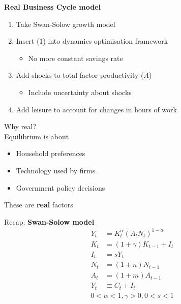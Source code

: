 \documentclass{beamer}
\begin{document}
\begin{frame}
  \textbf{Real Business Cycle model}\\
  \begin{enumerate}
    \item Take Swan-Solow growth model
    \item Insert (1) into dynamics optimisation framework
    \begin{itemize}
      \item No more constant savings rate
    \end{itemize}
    \item Add shocks to total factor productivity ($A$)
    \begin{itemize}
      \item Include uncertainty about shocks
    \end{itemize}
    \item Add leisure to account for changes in hours of work
  \end{enumerate}
\end{frame}

\begin{frame}
  Why real?\\
  \medskip
  Equilibrium is about
  \begin{itemize}
    \item Household preferences
    \item Technology used by firms
    \item Government policy decisions
  \end{itemize}
  \medskip
  These are \textbf{real} factors
\end{frame}

\begin{frame}
  Recap: \textbf{Swan-Solow model}
  \begin{align}
    Y_t &= K_t^{\alpha}(A_tN_t)^{1-\alpha}\\
    K_t &= (1+\gamma)K_{t-1} + I_t\\
    I_t &= sY_t\\
    N_t &= (1+n)N_{t-1}\\
    A_t &= (1+m)A_{t-1}\\
    Y_t &\equiv C_t + I_t
  \end{align}
  \begin{align*}
    0<\alpha<1, \gamma>0, 0<s<1
  \end{align*}
\end{frame}
\end{document}
